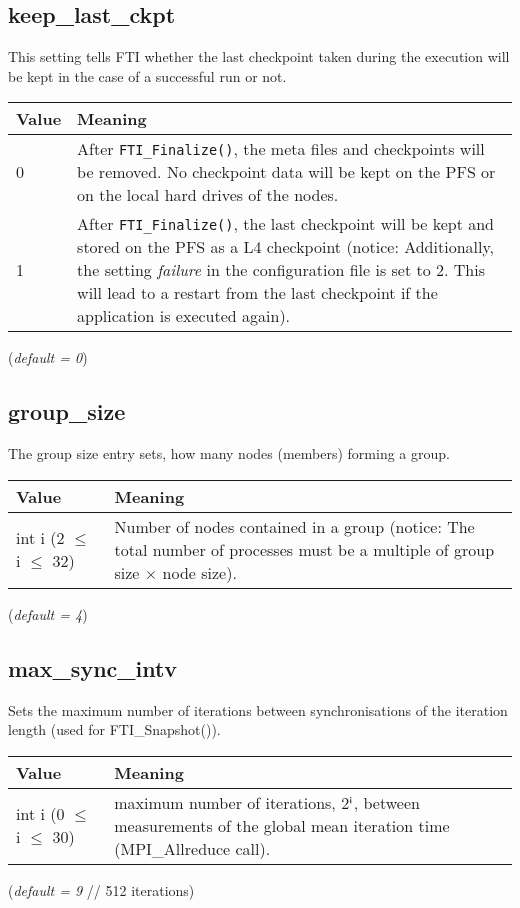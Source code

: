 \documentclass{refrep}
\begin{document}
\subsection{keep\_last\_ckpt}\label{subsec:keeplastckpt}
This setting tells FTI whether the last checkpoint taken during the execution will be kept in the case of a successful run or not.
\begin{center}
\begin{tabular}[h!]{|p{}|p{}|}
\hline
\textbf{Value} & \textbf{Meaning} \\ \hline
0 & After {\tt FTI\_Finalize()}, the meta files and checkpoints will be removed. No checkpoint data will be kept on the PFS or on the local hard drives of the nodes.  \\ \hline
1 & After {\tt FTI\_Finalize()}, the last checkpoint will be kept and stored on the PFS as a L4 checkpoint (notice: Additionally, the setting \emph{failure} in the configuration file is set to 2. This will lead to a restart from the last checkpoint if the application is executed again).  \\ \hline
\end{tabular}
\end{center}
(\textit{default = 0})
\subsection{group\_size}\label{subsec:groupsize}
The group size entry sets, how many nodes (members) forming a group.
\begin{center}
\begin{tabular}[h!]{|p{}|p{}|}
\hline
\textbf{Value} & \textbf{Meaning} \\ \hline
int i (2 $\leq$ i $\leq$ 32) & Number of nodes contained in a group (notice: The total number of processes must be a multiple of group size $\times$ node size). \\ \hline
\end{tabular}
\end{center}
(\textit{default = 4})
\subsection{max\_sync\_intv}\label{subsec:maxsynchintv}
Sets the maximum number of iterations between synchronisations of the iteration length (used for FTI\_Snapshot()).
\begin{center}
\begin{tabular}[h!]{|p{}|p{}|}
\hline
\textbf{Value} & \textbf{Meaning} \\ \hline
    int i (0 $\leq$ i $\leq$ 30) & maximum number of iterations, 2$^{\textsf i}$, between measurements of the global mean iteration time (MPI\_Allreduce call).  \\ \hline
\end{tabular}
\end{center}
(\textit{default = 9} // 512 iterations)
\end{document}
